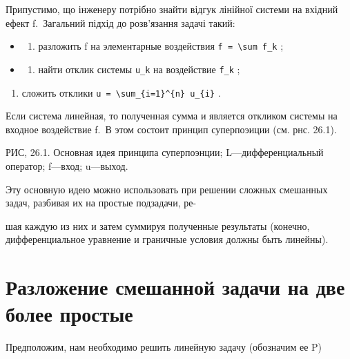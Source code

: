 \documentclass[
  ukrainian,
]{article}
\providecommand{\tightlist}{%
  \setlength{\itemsep}{0pt}\setlength{\parskip}{0pt}}
\begin{document}
Припустимо, що інженеру потрібно знайти відгук лінійної системи на
вхідний ефект f.~Загальний підхід до розв'язання задачі такий:

\begin{itemize}
\tightlist
\item
  \begin{enumerate}
  \def\labelenumi{\arabic{enumi})}
  \tightlist
  \item
    разложить f на элементарные воздействия
    \texttt{f\ =\ \textbackslash{}sum\ f\_k} ;
  \end{enumerate}
\item
  \begin{enumerate}
  \def\labelenumi{\arabic{enumi})}
  \setcounter{enumi}{1}
  \tightlist
  \item
    найти отклик системы \texttt{u\_k} на воздействие \texttt{f\_k} ;
  \end{enumerate}
\end{itemize}

\begin{enumerate}
\def\labelenumi{\arabic{enumi})}
\setcounter{enumi}{2}
\tightlist
\item
  сложить отклики
  \texttt{u\ =\ \textbackslash{}sum\_\{i=1\}\^{}\{n\}\ u\_\{i\}} .
\end{enumerate}

Если система линейная, то полученная сумма и является откликом системы
на входное воздействие f.~В этом состоит принцип суперпоэиции (см. рнс.
26.1).

РИС, 26.1. Основная идея принципа суперпоэнции; L---дифференциальный
оператор; f---вход; u---выход.

Эту основную идею можно использовать при решении сложных смешанных
задач, разбивая их на простые подзадачи, ре-

шая каждую из них и затем суммируя полученные результаты (конечно,
дифференциальное уравнение и граничные условия должны быть линейны).

\section{Разложение смешанной задачи на две более
простые}\label{ux440ux430ux437ux43bux43eux436ux435ux43dux438ux435-ux441ux43cux435ux448ux430ux43dux43dux43eux439-ux437ux430ux434ux430ux447ux438-ux43dux430-ux434ux432ux435-ux431ux43eux43bux435ux435-ux43fux440ux43eux441ux442ux44bux435}

Предположим, нам необходимо решить линейную задачу (обозначим ее P)
\end{document}

